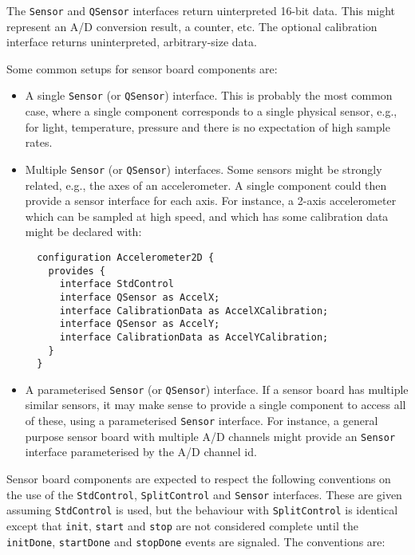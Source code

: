 \documentclass{article}
\newcommand{\code}[1]{{\tt #1}}
\begin{document}
The \code{Sensor} and \code{QSensor} interfaces return uinterpreted
16-bit data. This might represent an A/D conversion result, a counter,
etc. The optional calibration interface returns uninterpreted,
arbitrary-size data.

Some common setups for sensor board components are:
\begin{itemize}
\item A single \code{Sensor} (or \code{QSensor}) interface. This is
probably the most common case, where a single component corresponds to a
single physical sensor, e.g., for light, temperature, pressure and there is
no expectation of high sample rates.

\item Multiple \code{Sensor} (or \code{QSensor}) interfaces. Some sensors
might be strongly related, e.g., the axes of an accelerometer.  A single
component could then provide a sensor interface for each axis. For
instance, a 2-axis accelerometer which can be sampled at high speed, and which
has some calibration data might be declared with:
\begin{verbatim}
  configuration Accelerometer2D {
    provides {
      interface StdControl
      interface QSensor as AccelX;
      interface CalibrationData as AccelXCalibration;
      interface QSensor as AccelY;
      interface CalibrationData as AccelYCalibration;
    }
  }
\end{verbatim}

\item A parameterised \code{Sensor} (or \code{QSensor}) interface. If a
sensor board has multiple similar sensors, it may make sense to provide a
single component to access all of these, using a parameterised
\code{Sensor} interface. For instance, a general purpose sensor board with
multiple A/D channels might provide an \code{Sensor} interface
parameterised by the A/D channel id.
\end{itemize}

Sensor board components are expected to respect the following conventions
on the use of the \code{StdControl}, \code{SplitControl} and \code{Sensor}
interfaces.  These are given assuming \code{StdControl} is used, but the
behaviour with \code{SplitControl} is identical except that \code{init},
\code{start} and \code{stop} are not considered complete until the
\code{initDone}, \code{startDone} and \code{stopDone} events are
signaled. The conventions are:
\end{document}
